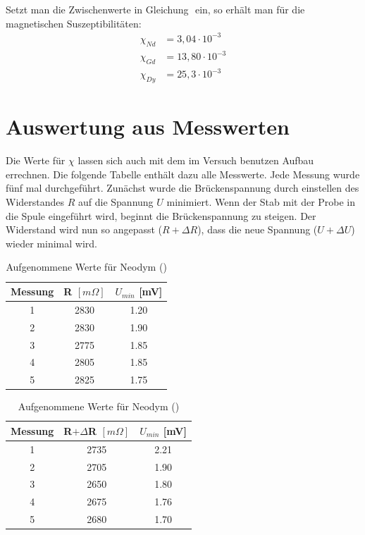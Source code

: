 Setzt man die Zwischenwerte in Gleichung $ $ ein, so erhält man für die magnetischen Suszeptibilitäten:
\begin{align*}
\chi_{Nd}&=3,04\cdot10^{-3}\\
\chi_{Gd}&=13,80\cdot10^{-3}\\
\chi_{Dy}&=25,3\cdot10^{-3}
\end{align*}

\section{Auswertung aus Messwerten}
Die Werte für $\chi$ lassen sich auch mit dem im Versuch benutzen Aufbau errechnen. Die folgende Tabelle enthält dazu alle Messwerte. Jede Messung wurde fünf mal durchgeführt. Zunächst wurde die Brückenspannung durch einstellen des Widerstandes $R$ auf die Spannung $U$ minimiert. Wenn der Stab mit der Probe in die Spule eingeführt wird, beginnt die Brückenspannung zu steigen. Der Widerstand wird nun so angepasst ($R + \Delta R$), dass die neue Spannung ($U + \Delta U$) wieder minimal wird.

\begin{table}[htbp]
\begin{tabular}{|c|c|c|}
Messung	& R $[m\Omega]$	&$U_{min}$ [mV]\\ \hline
1&	2830&	1.20\\ \hline
2&	2830&	1.90\\ \hline
3&	2775&	1.85\\ \hline
4&	2805&	1.85\\ \hline
5&	2825&	1.75\\ \hline
\end{tabular}
\begin{tabular}{|c|c|c|}
Messung	& R$+\Delta$R $[m\Omega]$&$U_{min}$ [mV] \\ \hline
1&	2735&	2.21\\ \hline
2&	2705&	1.90\\ \hline
3&	2650&	1.80\\ \hline
4&	2675&	1.76\\ \hline
5&	2680&	1.70\\ \hline
\end{tabular}
\caption{Aufgenommene Werte für Neodym ()}
\label{t_werte}
\end{table}

